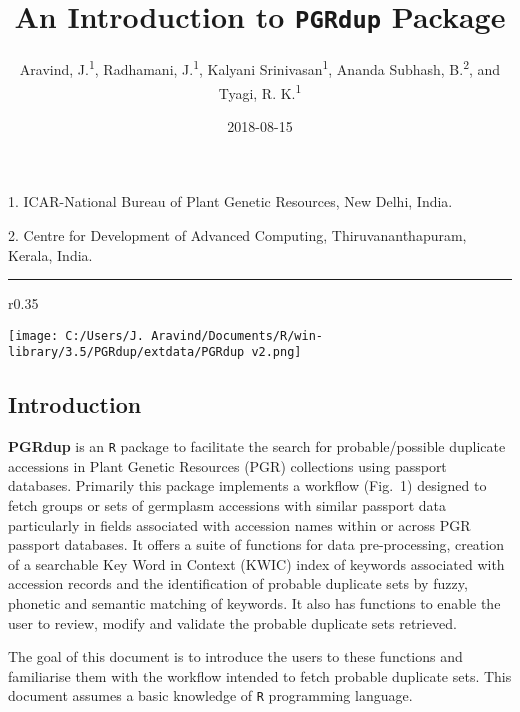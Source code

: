 \documentclass[]{article}
\title{An Introduction to \texttt{PGRdup} Package}
\author{Aravind, J.\textsuperscript{1}, Radhamani, J.\textsuperscript{1},
Kalyani Srinivasan\textsuperscript{1}, Ananda Subhash,
B.\textsuperscript{2}, and Tyagi, R. K.\textsuperscript{1}}
\date{2018-08-15}
\begin{document}
\maketitle

\begin{center}
1. ICAR-National Bureau of Plant Genetic Resources, New Delhi, India.

2. Centre for Development of Advanced Computing, Thiruvananthapuram, Kerala, India.

\end{center}

\begin{center}
\vspace{6pt}
\hrule
\end{center}

\tableofcontents

\begin{wrapfigure}{r}{0.35\textwidth}
  \vspace{1cm}
  \begin{center}
    \texttt{[image: C:/Users/J. Aravind/Documents/R/win-library/3.5/PGRdup/extdata/PGRdup v2.png]}
  \end{center}
  \vspace{-1.5cm}
\end{wrapfigure}\leavevmode

\hypertarget{introduction}{%
\subsection{Introduction }\label{introduction}}

\textbf{PGRdup} is an \texttt{R} package to facilitate the search for
probable/possible duplicate accessions in Plant Genetic Resources (PGR)
collections using passport databases. Primarily this package implements
a workflow (Fig.~1) designed to fetch groups or sets of germplasm
accessions with similar passport data particularly in fields associated
with accession names within or across PGR passport databases. It offers
a suite of functions for data pre-processing, creation of a searchable
Key Word in Context (KWIC) index of keywords associated with accession
records and the identification of probable duplicate sets by fuzzy,
phonetic and semantic matching of keywords. It also has functions to
enable the user to review, modify and validate the probable duplicate
sets retrieved.

The goal of this document is to introduce the users to these functions
and familiarise them with the workflow intended to fetch probable
duplicate sets. This document assumes a basic knowledge of \texttt{R}
programming language.
\end{document}

